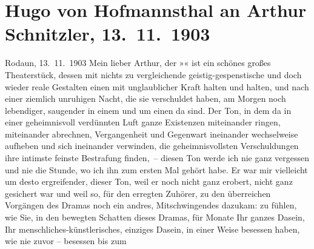 

         \renewcommand{\erwaehnteOrte}{Orte: Rodaun, Wien}
         \renewcommand{\erwaehnteWerke}{Werke: Anatol, Der einsame Weg. Schauspiel in fünf Akten}
               \section[Hugo von Hofmannsthal an Arthur Schnitzler, 13. 11. 1903]{ Hugo von Hofmannsthal an Arthur Schnitzler, 13. 11. 1903}\nopagebreak{}\rehead{ }\begin{ledgroupsized}[t]{13cm}\normalsize\beginnumbering \toendnotes[C]{\smallbreak\pagebreak[2]} \toendnotes[C]{\smallbreak}\pstart
           \raggedleft{}{\pb}Rodaun, 13. 11. 1903\pend
           \pstart{}Mein lieber Arthur, \pend\pstart
           der »« ist ein schönes großes Theaterstück, dessen mit nichts zu vergleichende
               geistig-gespenstische und doch wieder reale Gestalten einen mit unglaublicher Kraft
               halten und halten, und nach einer ziemlich unruhigen Nacht, die sie verschuldet
               haben, am Morgen noch lebendiger, saugender in einem und um einen da sind. Der Ton,
               in dem da in einer geheimnisvoll verdünnten Luft ganze Existenzen miteinander ringen,
               miteinander abrechnen, Vergangenheit und Gegenwart ineinander wechselweise aufheben
               und sich ineinander verwinden, die geheimnisvollsten Verschuldungen ihre intimste
               feinste Bestrafung finden, – diesen Ton werde ich nie ganz vergessen und nie die
               Stunde, wo ich ihn zum ersten Mal gehört habe. Er war mir vielleicht um desto
               ergreifender, dieser Ton, weil er noch nicht ganz erobert, nicht ganz gesichert war
               und weil so, für den erregten Zuhörer, zu den überreichen Vorgängen des Dramas noch
               ein andres, Mitschwingendes dazukam: zu fühlen, wie Sie, in den bewegten Schatten
               dieses Dramas, für Monate Ihr ganzes Dasein, Ihr menschliches-künstlerisches,
               einziges Dasein, in einer Weise besessen haben, wie nie zuvor – besessen bis zum

\end{ledgroupsized}
